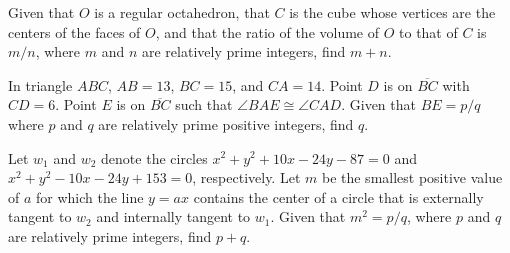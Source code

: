 \begin{question}[name={2005 AIME II, \href{https://artofproblemsolving.com/community/c4p368278}{Problem 10}}]
	Given that $O$ is a regular octahedron, that $C$ is the cube whose vertices are the centers of the faces of $O$, and that the ratio of the volume of $O$ to that of $C$ is ${m}/{n}$, where $m$ and $n$ are relatively prime integers, find $m+n$.	
\end{question}


%	


















\begin{question}[name={2005 AIME II, \href{https://artofproblemsolving.com/community/c4p368562}{Problem 14}}]
	In triangle $ABC$, $AB=13$, $BC=15$, and $CA=14$. Point $D$ is on $\overline{BC}$ with $CD=6.$ Point $E$ is on $\overline{BC}$ such that $\angle BAE\cong \angle CAD.$ Given that $BE= p/q$ where $p$ and $q$ are relatively prime positive integers, find $q$.
\end{question}


%	













\begin{question}[name={2005 AIME II, \href{https://artofproblemsolving.com/community/c4p368567}{Problem 15}}]
	Let $w_{1}$ and $w_{2}$ denote the circles $x^{2}+y^{2}+10x-24y-87=0$ and $x^{2}+y^{2}-10x-24y+153=0$, respectively. Let $m$ be the smallest positive value of $a$ for which the line $y=ax$ contains the center of a circle that is externally tangent to $w_{2}$ and internally tangent to $w_{1}$. Given that $m^{2}=p/q$, where $p$ and $q$ are relatively prime integers, find $p+q$.
\end{question}


%	

















